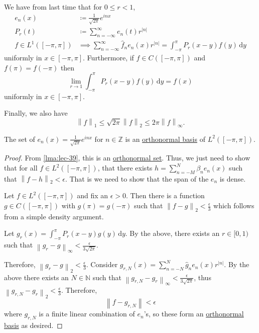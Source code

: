 \begin{prev}
	We have from last time that for \(0 \leq r < 1\),
	\[
		\begin{split}
			e_n(x)                & \coloneqq \frac{1}{\sqrt{2\pi} }e^{inx}                                                         \\
			P_r(t)                & \coloneqq \sum_{n=-\infty}^\infty e_n(t)r^{\left\vert n \right\vert }\\
			f \in L^1([-\pi,\pi]) & \implies \sum_{n=-\infty}^\infty \hat{f}_ne_n(x)r^{\left\vert n \right\vert } = \int_{-\pi}^\pi P_r(x-y)f(y) \,\mathrm{d}y
		\end{split}
	\]
	uniformly in \(x \in [-\pi,\pi]\). Furthermore, if \(f \in C([-\pi,\pi])\) and \(f(\pi) = f(-\pi)\) then
	\[
		\lim_{r \to 1} \int_{-\pi}^\pi P_r(x-y)f(y) \,\mathrm{d}y = f(x)
	\]
	uniformly in \(x \in [-\pi,\pi]\).

	Finally, we also have
	\[
		\left\lVert f\right\rVert_1 \leq \sqrt{2\pi} \left\lVert f\right\rVert_2 \leq 2\pi \left\lVert f\right\rVert_\infty.
	\]
\end{prev}

\begin{theorem}\label{thm:fourier-series}
	The set of \(e_n(x) = \frac{1}{\sqrt{2\pi} }e^{inx}\) for \(n \in \mathbb{Z} \) is an
	\hyperref[def:orthonormal-basis]{orthonormal basis} of \(L^2([-\pi,\pi])\).
\end{theorem}
\begin{proof}
	From \autoref{lma:lec-39}, this is an \hyperref[def:orthonormal-set]{orthonormal set}. Thus, we just need to show that for
	all \(f \in L^2([-\pi,\pi])\), that there exists \(h = \sum_{n=-M}^N \beta_n e_n(x)\) such that
	\(\left\lVert f-h\right\rVert _2 < \epsilon \). That is we need to show that the span of the \(e_n\) is dense.

	Let \(f \in L^2([-\pi,\pi])\) and fix an \(\epsilon > 0\). Then there is a function \(g \in C([-\pi,\pi])\) with \(g(\pi) = g(-\pi)\)
	such that \(\left\lVert f-g\right\rVert_2 < \frac{\epsilon}{3}\) which follows from a simple density argument.

	Let \(g_r(x) = \int_{-\pi}^\pi P_r(x-y)g(y) \,\mathrm{d}y\). By the above, there exists an \(r \in [0,1)\) such that
	\(\left\lVert g_r - g\right\rVert_\infty < \frac{\epsilon }{3\sqrt{2\pi}}\).

	Therefore, \(\left\lVert g_r - g\right\rVert_2 < \frac{\epsilon }{3}\). Consider
	\(g_{r,N}(x) = \sum_{n=-N}^N \hat{g} _n e_n(x)r^{\left\vert n \right\vert }\). By the above there exists an
	\(N \in \mathbb{N} \) such that \(\left\lVert g_{r,N} - g_r\right\rVert _\infty < \frac{\epsilon }{3\sqrt{2\pi}}\),
	thus \(\left\lVert g_{r,N} - g_r\right\rVert_2 < \frac{\epsilon}{3}\). Therefore,
	\[
		\left\lVert f - g_{r,N}\right\rVert < \epsilon
	\]
	where \(g_{r,N}\) is a finite linear combination of \(e_n\)'s, so these form an \hyperref[def:orthonormal-basis]{orthonormal basis}
	as desired.
\end{proof}

